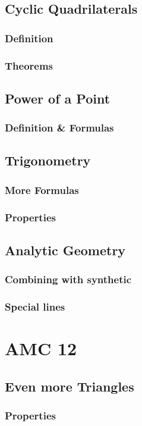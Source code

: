 \documentclass[11pt]{article}
\begin{document}
\subsection{Cyclic Quadrilaterals}
\subsubsection*{Definition}
\subsubsection*{Theorems}
\subsection{Power of a Point}
\subsubsection*{Definition \& Formulas}
\subsection{Trigonometry}
\subsubsection*{More Formulas}
\subsubsection*{Properties}
\subsection{Analytic Geometry}
\subsubsection*{Combining with synthetic}
\subsubsection*{Special lines}
\section{AMC 12}
\subsection{Even more Triangles}
\subsubsection*{Properties}
\end{document}
